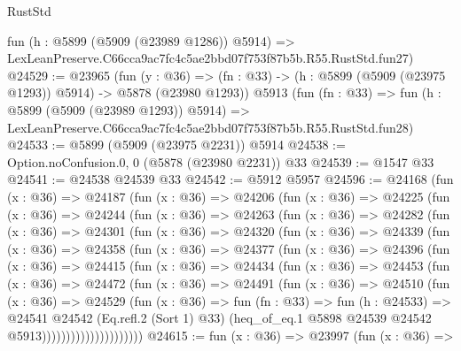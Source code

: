 \begin{lexlean}{RustStd}
\begin{coremodule}
{{    fun (h : @5899 (@5909 (@23989 @1286)) @5914) =>
    LexLeanPreserve.C66cca9ac7fc4c5ae2bbd07f753f87b5b.R55.RustStd.fun27)
@24529 := @23965
    (fun (y : @36) =>
    (fn : @33) -> (h : @5899 (@5909 (@23975 @1293)) @5914) -> @5878 (@23980 @1293))
    @5913
    (fun (fn : @33) =>
    fun (h : @5899 (@5909 (@23989 @1293)) @5914) =>
    LexLeanPreserve.C66cca9ac7fc4c5ae2bbd07f753f87b5b.R55.RustStd.fun28)
@24533 := @5899 (@5909 (@23975 @2231)) @5914
@24538 := Option.noConfusion.{0, 0} (@5878 (@23980 @2231)) @33
@24539 := @1547 @33
@24541 := @24538 @24539 @33
@24542 := @5912 @5957
@24596 := @24168
    (fun (x : @36) =>
    @24187
      (fun (x : @36) =>
      @24206
        (fun (x : @36) =>
        @24225
          (fun (x : @36) =>
          @24244
            (fun (x : @36) =>
            @24263
              (fun (x : @36) =>
              @24282
                (fun (x : @36) =>
                @24301
                  (fun (x : @36) =>
                  @24320
                    (fun (x : @36) =>
                    @24339
                      (fun (x : @36) =>
                      @24358
                        (fun (x : @36) =>
                        @24377
                          (fun (x : @36) =>
                          @24396
                            (fun (x : @36) =>
                            @24415
                              (fun (x : @36) =>
                              @24434
                                (fun (x : @36) =>
                                @24453
                                  (fun (x : @36) =>
                                  @24472
                                    (fun (x : @36) =>
                                    @24491
                                      (fun (x : @36) =>
                                      @24510
                                        (fun (x : @36) =>
                                        @24529
                                          (fun (x : @36) =>
                                          fun (fn : @33) =>
                                          fun (h : @24533) =>
                                          @24541
                                            @24542
                                            (Eq.refl.{2} (Sort 1) @33)
                                            (heq_of_eq.{1}
                                              @5898
                                              @24539
                                              @24542
                                              @5913)))))))))))))))))))))
@24615 := fun (x : @36) =>
  @23997
    (fun (x : @36) =>
}}
\end{coremodule}
\end{lexlean}
